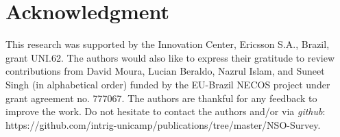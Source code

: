\documentclass[preprint,10pt,number,5p,twocolumn]{elsarticle}
\begin{document}









\section*{Acknowledgment}

This research was supported by the Innovation Center, Ericsson S.A., Brazil, grant UNI.62. The authors would also like to express their gratitude to review contributions from David Moura,  Lucian Beraldo, Nazrul Islam, and Suneet Singh (in alphabetical order) funded by the EU-Brazil NECOS project under grant agreement no. 777067.
The authors are thankful for any feedback to improve the work. Do not hesitate to contact the authors and/or via \textit{github}: 
https://github.com/intrig-unicamp/publications/tree/master/NSO-Survey.


 

\end{document}
